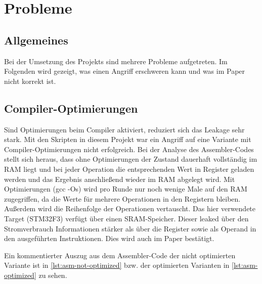 \documentclass[a4paper,ngerman]{scrreprt}
\begin{document}
\chapter{Probleme}

\section{Allgemeines}

Bei der Umsetzung des Projekts sind mehrere Probleme aufgetreten. Im Folgenden
wird gezeigt, was einen Angriff erschweren kann und was im Paper
\cite{jungk_bhasin_2017} nicht korrekt ist.


\section{Compiler-Optimierungen}

Sind Optimierungen beim Compiler aktiviert, reduziert sich das Leakage sehr
stark. Mit den Skripten in diesem Projekt war ein Angriff auf eine Variante mit
Compiler-Optimierungen nicht erfolgreich. Bei der Analyse des Assembler-Codes
stellt sich heraus, dass ohne Optimierungen der Zustand dauerhaft vollständig im
RAM liegt und bei jeder Operation die entsprechenden Wert in Register geladen
werden und das Ergebnis anschließend wieder im RAM abgelegt wird. Mit
Optimierungen (gcc -Os) wird pro Runde nur noch wenige Male auf den RAM
zugegriffen, da die Werte für mehrere Operationen in den Registern bleiben.
Außerdem wird die Reihenfolge der Operationen vertauscht. Das hier verwendete
Target (STM32F3) verfügt über einen SRAM-Speicher. Dieser leaked über den
Stromverbrauch Informationen stärker als über die Register sowie als Operand in
den ausgeführten Instruktionen. Dies wird auch im Paper
\cite{adomnicai_fournier_masson_2017} bestätigt.

Ein kommentierter Auszug aus dem Assembler-Code der nicht optimierten Variante
ist in \autoref{lst:asm-not-optimized} bzw. der optimierten Varianten in
\autoref{lst:asm-optimized} zu sehen.
\end{document}
